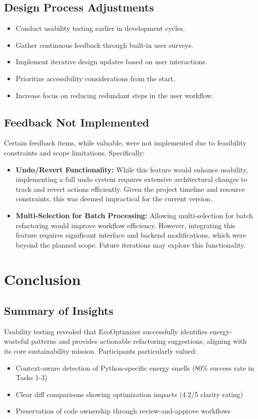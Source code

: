 \documentclass{article}
\begin{document}
\subsection{Design Process Adjustments}
\begin{itemize}
\item Conduct usability testing earlier in development cycles.
\item Gather continuous feedback through built-in user surveys.
\item Implement iterative design updates based on user interactions.
\item Prioritize accessibility considerations from the start.
\item Increase focus on reducing redundant steps in the user workflow.
\end{itemize}

\subsection{Feedback Not Implemented}
Certain feedback items, while valuable, were not implemented due to feasibility constraints and scope limitations. Specifically:
\begin{itemize}
\item \textbf{Undo/Revert Functionality:} While this feature would enhance usability, implementing a full undo system requires extensive architectural changes to track and revert actions efficiently. Given the project timeline and resource constraints, this was deemed impractical for the current version.
\item \textbf{Multi-Selection for Batch Processing:} Allowing multi-selection for batch refactoring would improve workflow efficiency. However, integrating this feature requires significant interface and backend modifications, which were beyond the planned scope. Future iterations may explore this functionality.
\end{itemize}


\newpage

\section{Conclusion}
\subsection{Summary of Insights}
Usability testing revealed that EcoOptimizer successfully identifies energy-wasteful patterns and provides actionable refactoring suggestions, aligning with its core sustainability mission. Participants particularly valued:
\begin{itemize}
\item Context-aware detection of Python-specific energy smells (80\% success rate in Tasks 1-3)
\item Clear diff comparisons showing optimization impacts (4.2/5 clarity rating)
\item Preservation of code ownership through review-and-approve workflows
\end{itemize}
\end{document}

